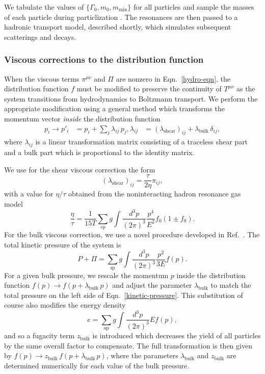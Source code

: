 \documentclass[aps,prc,reprint,amsmath,nofootinbib]{revtex4-1}
\def\\#1{ #1}
\begin{document}
We tabulate the values of $\{\Gamma_0, m_0, m_\mathrm{min}\}$ for all particles and sample the masses of each particle during particlization \cite{PDG:2017}.
The resonances are then passed to a hadronic transport model, described shortly, which simulates subsequent scatterings and decays.

\subsubsection{Viscous corrections to the distribution function}

When the viscous terms $\pi^{\mu\nu}$ and $\Pi$ are nonzero in Eqn.~\eqref{hydro-eqn}, the distribution function $f$ must be modified to preserve the continuity of $T^{\mu\nu}$ as the system transitions from hydrodynamics to Boltzmann transport.
We perform the appropriate modification using a general method which transforms the momentum vector \emph{inside} the distribution function \cite{Pratt:2010jt}
\begin{align}
  \label{viscous_correction}
  p_i \rightarrow p'_i &= p_i + \sum\limits_j \lambda_{ij}\, p_j,\\
  \lambda_{ij} &= (\lambda_\mathrm{shear})_{ij} + \lambda_\mathrm{bulk}\, \delta_{ij},
\end{align}
where $\lambda_{ij}$ is a linear transformation matrix consisting of a traceless shear part and a bulk part which is proportional to the identity matrix.

We use for the shear viscous correction the form \cite{Pratt:2010jt}
\begin{equation}
  (\lambda_\mathrm{shear})_{ij} = \frac{\tau}{2 \eta} \pi_{ij},
\end{equation}
with a value for $\eta/\tau$ obtained from the noninteracting hadron resonance gas model
\begin{equation}
  \frac{\eta}{\tau} = \frac{1}{15 T} \sum\limits_{sp} g \int \frac{d^3p}{(2\pi)^3}\frac{p^4}{E^2} f_0 (1 \pm f_0).
\end{equation}
For the bulk viscous correction, we use a novel procedure developed in Ref.~\cite{Bernhard:2018hnz}.
The total kinetic pressure of the system is
\begin{equation}
  \label{kinetic-pressure}
  P + \Pi = \sum\limits_\mathrm{sp} g \int \frac{d^3p}{(2\pi)^3} \frac{p^2}{3E} f(p).
\end{equation}
For a given bulk pressure, we rescale the momentum $p$ inside the distribution function $f(p) \rightarrow f(p + \lambda_\mathrm{bulk}\, p)$ and adjust the parameter $\lambda_\mathrm{bulk}$ to match the total pressure on the left side of Eqn.~\eqref{kinetic-pressure}.
This substitution of course also modifies the energy density
\begin{equation}
  e = \sum\limits_\mathrm{sp} g \int \frac{d^3p}{(2 \pi)^3} E f(p),
\end{equation}
and so a fugacity term $z_\mathrm{bulk}$ is introduced which decreases the yield of all particles by the same overall factor to compensate.
The full transformation is then given by $f(p) \rightarrow z_\mathrm{bulk}\, f(p + \lambda_\mathrm{bulk}\, p)$, where the parameters $\lambda_\mathrm{bulk}$ and $z_\mathrm{bulk}$ are determined numerically for each value of the bulk pressure.
\end{document}
